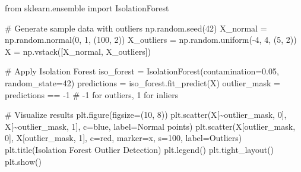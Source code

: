 \documentclass[
  letterpaper,
  DIV=11,
  numbers=noendperiod]{scrreprt}
\newenvironment{Shaded}{\begin{snugshade}}{\end{snugshade}}
\newcommand{\CommentTok}[1]{\textcolor[rgb]{0.37,0.37,0.37}{#1}}
\newcommand{\DecValTok}[1]{\textcolor[rgb]{0.68,0.00,0.00}{#1}}
\newcommand{\FloatTok}[1]{\textcolor[rgb]{0.68,0.00,0.00}{#1}}
\newcommand{\ImportTok}[1]{\textcolor[rgb]{0.00,0.46,0.62}{#1}}
\newcommand{\NormalTok}[1]{\textcolor[rgb]{0.00,0.23,0.31}{#1}}
\newcommand{\OperatorTok}[1]{\textcolor[rgb]{0.37,0.37,0.37}{#1}}
\newcommand{\StringTok}[1]{\textcolor[rgb]{0.13,0.47,0.30}{#1}}
\begin{document}
\begin{Shaded}
\begin{Highlighting}[]
\ImportTok{from}\NormalTok{ sklearn.ensemble }\ImportTok{import}\NormalTok{ IsolationForest}

\CommentTok{\# Generate sample data with outliers}
\NormalTok{np.random.seed(}\DecValTok{42}\NormalTok{)}
\NormalTok{X\_normal }\OperatorTok{=}\NormalTok{ np.random.normal(}\DecValTok{0}\NormalTok{, }\DecValTok{1}\NormalTok{, (}\DecValTok{100}\NormalTok{, }\DecValTok{2}\NormalTok{))}
\NormalTok{X\_outliers }\OperatorTok{=}\NormalTok{ np.random.uniform(}\OperatorTok{{-}}\DecValTok{4}\NormalTok{, }\DecValTok{4}\NormalTok{, (}\DecValTok{5}\NormalTok{, }\DecValTok{2}\NormalTok{))}
\NormalTok{X }\OperatorTok{=}\NormalTok{ np.vstack([X\_normal, X\_outliers])}

\CommentTok{\# Apply Isolation Forest}
\NormalTok{iso\_forest }\OperatorTok{=}\NormalTok{ IsolationForest(contamination}\OperatorTok{=}\FloatTok{0.05}\NormalTok{, random\_state}\OperatorTok{=}\DecValTok{42}\NormalTok{)}
\NormalTok{predictions }\OperatorTok{=}\NormalTok{ iso\_forest.fit\_predict(X)}
\NormalTok{outlier\_mask }\OperatorTok{=}\NormalTok{ predictions }\OperatorTok{==} \OperatorTok{{-}}\DecValTok{1}  \CommentTok{\# {-}1 for outliers, 1 for inliers}

\CommentTok{\# Visualize results}
\NormalTok{plt.figure(figsize}\OperatorTok{=}\NormalTok{(}\DecValTok{10}\NormalTok{, }\DecValTok{8}\NormalTok{))}
\NormalTok{plt.scatter(X[}\OperatorTok{\textasciitilde{}}\NormalTok{outlier\_mask, }\DecValTok{0}\NormalTok{], X[}\OperatorTok{\textasciitilde{}}\NormalTok{outlier\_mask, }\DecValTok{1}\NormalTok{], c}\OperatorTok{=}\StringTok{\textquotesingle{}blue\textquotesingle{}}\NormalTok{, label}\OperatorTok{=}\StringTok{\textquotesingle{}Normal points\textquotesingle{}}\NormalTok{)}
\NormalTok{plt.scatter(X[outlier\_mask, }\DecValTok{0}\NormalTok{], X[outlier\_mask, }\DecValTok{1}\NormalTok{], c}\OperatorTok{=}\StringTok{\textquotesingle{}red\textquotesingle{}}\NormalTok{, marker}\OperatorTok{=}\StringTok{\textquotesingle{}x\textquotesingle{}}\NormalTok{, s}\OperatorTok{=}\DecValTok{100}\NormalTok{, label}\OperatorTok{=}\StringTok{\textquotesingle{}Outliers\textquotesingle{}}\NormalTok{)}
\NormalTok{plt.title(}\StringTok{\textquotesingle{}Isolation Forest Outlier Detection\textquotesingle{}}\NormalTok{)}
\NormalTok{plt.legend()}
\NormalTok{plt.tight\_layout()}
\NormalTok{plt.show()}


\end{Highlighting}
\end{Shaded}
\end{document}
